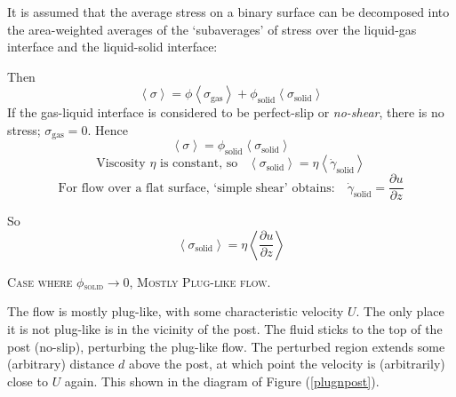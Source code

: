 \documentclass[12pt, a4paper, twoside, openright]{book}
\newcommand{\phisol}{\ensuremath{\phi_{\mathrm{solid}}}}
\newcommand{\sigsol}{\ensuremath{\sigma_{\mathrm{solid}}}}
\begin{document}
It is assumed that the average stress on a binary surface can be decomposed into the area-weighted averages of the `subaverages' of stress over the liquid-gas interface and the liquid-solid interface:

Then 
\begin{equation}
\left< \sigma \right> = \phi \left< \sigma_{\mathrm{gas}} \right> + 
\phisol \left<  \sigsol \right> 
\end{equation}
If the gas-liquid interface is considered to be perfect-slip or \emph{no-shear}, there is no stress; $ \sigma_{\mathrm{gas}} = 0 $.  Hence 
\begin{equation}
\left< \sigma \right> = \phisol \left<  \sigsol \right>
\end{equation}
\begin{equation}
\text{Viscosity $\eta$ is constant, so} \;\;\;
\left< \sigsol \right> = \eta \left< \dot{\gamma}_{\mathrm{solid}} \right>
\end{equation}
\begin{equation}
\text{For flow over a flat surface, `simple shear' obtains:} \quad
\dot{\gamma}_{\mathrm{solid}} = \frac{\partial u}{\partial z}
\end{equation}

So
\begin{equation}
\left< \sigsol \right> = \eta \left< \frac{\partial u}{\partial z} \right>
\end{equation}

\vspace{1em}
\colorbox[gray]{0.8}{ \textsc{Case where $\phisol \rightarrow 0$, Mostly Plug-like flow.} }
\vspace{0.5em}

The flow is mostly plug-like, with some characteristic velocity $U$.  The only place it is not plug-like is in the vicinity of the post.  The fluid sticks to the top of the post (no-slip), perturbing the plug-like flow.  The perturbed region extends some (arbitrary) distance $d$ above the post, at which point the velocity is (arbitrarily) close to $U$ again.  This shown in the diagram of Figure (\ref{plugnpost}).

\end{document}
